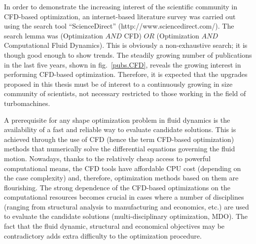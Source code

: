 In order to demonstrate the increasing interest of the scientific community in CFD-based optimization, an internet-based literature survey was carried out using the search tool ``ScienceDirect'' (http://www.sciencedirect.com/). The search lemma was (Optimization $AND$ CFD) $OR$ (Optimization $AND$ Computational Fluid Dynamics).  This is obviously a non-exhaustive search; it is though good enough to show trends.  The steadily growing number of publications in the last five years, shown in fig.\ \ref{pubs.CFD}, reveals the growing interest in performing CFD-based optimization. Therefore, it is expected that the upgrades proposed in this thesis must be of interest to a continuously growing in size community of scientists, not necessary restricted to those working in the field of turbomachines.     
 
A prerequisite for any shape optimization problem in fluid dynamics is the availability of a fast and reliable way to evaluate candidate solutions. This is achieved through the use of CFD (hence the term CFD-based optimization) methods that numerically solve the differential equations governing the fluid motion. Nowadays, thanks to the relatively cheap access to powerful computational means, the CFD tools have affordable CPU cost (depending on the case complexity) and, therefore, optimization methods based on them are flourishing. The strong dependence of the CFD-based optimizations on the computational resources becomes crucial in cases where a number of disciplines (ranging from structural analysis to manufacturing and economics, etc.) are used to evaluate the candidate solutions (multi-disciplinary optimization, MDO). The fact that the fluid dynamic, structural and economical objectives may be contradictory adds extra difficulty to the optimization procedure.           
 
